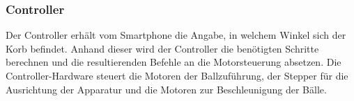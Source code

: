 \subsubsection{Controller}
	Der Controller erhält vom Smartphone die Angabe, in welchem Winkel sich der Korb befindet. Anhand dieser wird der Controller die benötigten Schritte berechnen und die resultierenden Befehle an die Motorsteuerung absetzen. Die Controller-Hardware steuert die Motoren der Ballzuführung, der Stepper für die Ausrichtung der Apparatur und die Motoren zur Beschleunigung der Bälle.